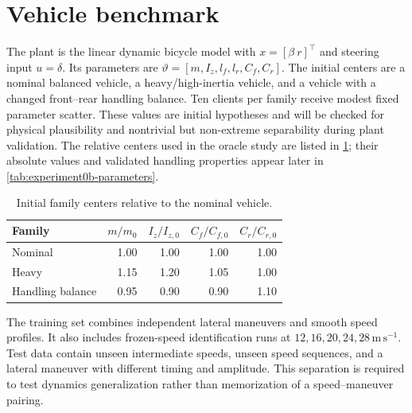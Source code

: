 \section{Vehicle benchmark}
\label{sec:benchmark}
The plant is the linear dynamic bicycle model with
$x=[\beta\ r]^\top$ and steering input $u=\delta$. Its parameters are
$\vartheta=[m,I_z,l_f,l_r,C_f,C_r]$. The initial centers are a nominal balanced
vehicle, a heavy/high-inertia vehicle, and a vehicle with a changed front--rear
handling balance. Ten clients per family receive modest fixed parameter scatter.
These values are initial hypotheses and will be checked for physical plausibility
and nontrivial but non-extreme separability during plant validation.
The relative centers used in the oracle study are listed in \cref{tab:families};
their absolute values and validated handling properties appear later in
\cref{tab:experiment0b-parameters}.

\begin{table}[ht]
\centering
\caption{Initial family centers relative to the nominal vehicle.}
\label{tab:families}
\begin{tabular}{lrrrr}
\toprule
Family & $m/m_0$ & $I_z/I_{z,0}$ & $C_f/C_{f,0}$ & $C_r/C_{r,0}$\\
\midrule
Nominal & 1.00 & 1.00 & 1.00 & 1.00\\
Heavy & 1.15 & 1.20 & 1.05 & 1.00\\
Handling balance & 0.95 & 0.90 & 0.90 & 1.10\\
\bottomrule
\end{tabular}
\end{table}

The training set combines independent lateral maneuvers and smooth speed profiles.
It also includes frozen-speed identification runs at
$12,16,20,24,28\,\mathrm{m\,s^{-1}}$. Test data contain unseen intermediate
speeds, unseen speed sequences, and a lateral maneuver with different timing and
amplitude. This separation is required to test dynamics generalization rather than
memorization of a speed--maneuver pairing.

